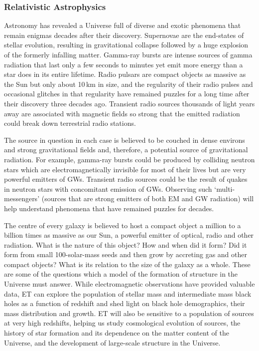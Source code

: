 \subsubsection{Relativistic Astrophysics}
Astronomy has revealed a Universe full of diverse and exotic phenomena that remain enigmas decades after their discovery.
Supernovae are the end-states of stellar evolution, resulting in gravitational collapse followed by a huge explosion of the formerly infalling matter.
Gamma-ray bursts are intense sources of gamma radiation that last only a few seconds to minutes yet emit more energy than a star does in its entire lifetime.
Radio pulsars are compact objects as massive as the Sun but only about 10\,km in size, and the regularity of their radio pulses and occasional glitches in that regularity have remained  puzzles for a long time after their discovery three decades ago.
Transient radio sources thousands of light years away are associated with magnetic fields so strong that the emitted radiation could break down terrestrial radio stations.

The source in question in each case is believed to be couched in dense environs and strong gravitational fields and, therefore, a potential source of gravitational radiation. For example, gamma-ray bursts could be produced by colliding neutron stars which are electromagnetically invisible for most of their lives but are very powerful emitters of GWs. Transient radio sources could be the result of quakes in neutron stars with concomitant emission of GWs.
Observing such `multi-messengers' (sources that are strong emitters of both EM and GW radiation) will help understand phenomena that have remained puzzles for decades.

The centre of every galaxy is believed to host a compact object a million to a billion times as massive as our Sun, a powerful emitter of optical, radio and other radiation.
What is the nature of this object? How and when did it form?
Did it form from small 100-solar-mass seeds and then grow by accreting gas and other compact objects? What is its relation to the size of the galaxy as a whole.
These are some of the questions which a model of the formation of structure in the Universe must answer.  
While electromagnetic observations  have provided valuable data, ET can explore the population of stellar mass and intermediate mass black holes as a function  of redshift and shed light on black hole demographics, their 
mass distribution and growth.
ET will also be sensitive to a population of sources at very high redshifts, helping us study cosmological evolution of sources, the history of star formation and its dependence on the matter content of the Universe, and the development of large-scale structure in the Universe. 
\FloatBarrier
